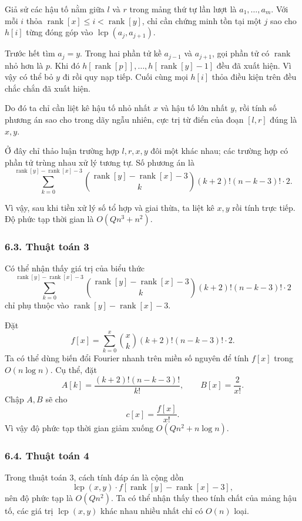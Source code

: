 \documentclass[11pt]{article}
\begin{document}
Giả sử các hậu tố nằm giữa \(l\) và \(r\) trong mảng thứ tự lần lượt là
\(a_1,\ldots,a_m\). Với mỗi \(i\) thỏa
\(\operatorname{rank}[x]\le i<\operatorname{rank}[y]\), chỉ cần chứng minh
tồn tại một \(j\) sao cho \(h[i]\) từng đóng góp vào
\(\operatorname{lcp}(a_j,a_{j+1})\).

Trước hết tìm \(a_j=y\). Trong hai phần tử kề \(a_{j-1}\) và \(a_{j+1}\), gọi
phần tử có \(\operatorname{rank}\) nhỏ hơn là \(p\). Khi đó
\(h[\operatorname{rank}[p]],\ldots,h[\operatorname{rank}[y]-1]\) đều đã xuất
hiện. Vì vậy có thể bỏ \(y\) đi rồi quy nạp tiếp. Cuối cùng mọi \(h[i]\) thỏa
điều kiện trên đều chắc chắn đã xuất hiện.

Do đó ta chỉ cần liệt kê hậu tố nhỏ nhất \(x\) và hậu tố lớn nhất \(y\), rồi
tính số phương án sao cho trong dãy ngẫu nhiên, cực trị từ điển của đoạn
\([l,r]\) đúng là \(x,y\).

Ở đây chỉ thảo luận trường hợp \(l,r,x,y\) đôi một khác nhau; các trường hợp
có phần tử trùng nhau xử lý tương tự. Số phương án là
\[
  \sum_{k=0}^{\operatorname{rank}[y]-\operatorname{rank}[x]-3}
  \binom{\operatorname{rank}[y]-\operatorname{rank}[x]-3}{k}
  (k+2)!(n-k-3)!\cdot 2.
\]

Vì vậy, sau khi tiền xử lý số tổ hợp và giai thừa, ta liệt kê \(x,y\) rồi tính
trực tiếp. Độ phức tạp thời gian là \(O(Qn^3+n^2)\).

\subsubsection*{6.3. Thuật toán 3}

Có thể nhận thấy giá trị của biểu thức
\[
  \sum_{k=0}^{\operatorname{rank}[y]-\operatorname{rank}[x]-3}
  \binom{\operatorname{rank}[y]-\operatorname{rank}[x]-3}{k}
  (k+2)!(n-k-3)!\cdot 2
\]
chỉ phụ thuộc vào \(\operatorname{rank}[y]-\operatorname{rank}[x]-3\).

Đặt
\[
  f[x]=\sum_{k=0}^{x}\binom{x}{k}(k+2)!(n-k-3)!\cdot 2.
\]
Ta có thể dùng biến đổi Fourier nhanh trên miền số nguyên để tính \(f[x]\)
trong \(O(n\log n)\). Cụ thể, đặt
\[
  A[k]=\frac{(k+2)!(n-k-3)!}{k!},\qquad
  B[x]=\frac{2}{x!}.
\]
Chập \(A,B\) sẽ cho
\[
  c[x]=\frac{f[x]}{x!}.
\]
Vì vậy độ phức tạp thời gian giảm xuống \(O(Qn^2+n\log n)\).

\subsubsection*{6.4. Thuật toán 4}

Trong thuật toán 3, cách tính đáp án là cộng dồn
\[
  \operatorname{lcp}(x,y)\cdot
  f[\operatorname{rank}[y]-\operatorname{rank}[x]-3],
\]
nên độ phức tạp là \(O(Qn^2)\). Ta có thể nhận thấy theo tính chất của mảng
hậu tố, các giá trị \(\operatorname{lcp}(x,y)\) khác nhau nhiều nhất chỉ có
\(O(n)\) loại.
\end{document}
